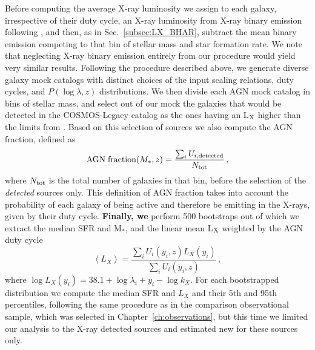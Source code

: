 Before computing the average X-ray luminosity we assign to each galaxy, irrespective of their duty cycle, an X-ray luminosity from X-ray binary emission following \citet[][Table 3]{2016ApJ...825....7L}, and then, as in Sec.~\ref{subsec:LX_BHAR}, subtract the mean binary emission competing to that bin of stellar mass and star formation rate. We note that neglecting X-ray binary emission entirely from our procedure would yield very similar results.
Following the procedure described above, we generate diverse galaxy mock catalogs with distinct choices of the input scaling relations, duty cycles, and $P(\log\lambda,z)$ distributions. 
We then divide each AGN mock catalog in bins of stellar mass, and select out of our mock the galaxies that would be detected in the COSMOS-Legacy catalog as the ones having an L$_{\rm X}$ higher than the limits from \citet{2016ApJ...817...34M}. Based on this selection of sources we also compute the AGN fraction, defined as
\begin{equation}
{\rm AGN\;fraction}(M_*,z)=\frac{\sum_i U_{i,{\rm detected}}} {N_{\rm tot}}\, ,
    \label{eq:AGN_fraction}
\end{equation}
where $N_{\rm tot}$ is the total number of galaxies in that bin, before the selection of the {\it detected} sources only. This definition of AGN fraction takes into account the probability of each galaxy of being active and therefore be emitting in the X-rays, given by their duty cycle.
{\bf Finally, we} perform 500 bootstraps out of which we extract the median SFR and M$_*$, and the linear mean L$_{\rm X}$ weighted by the AGN duty cycle %
\begin{equation}
\left<L_X\right>=\frac{\sum_i U_i(y_i,z) L_X(y_i)} {\sum_i U_i(y_i,z)}\, ,
    \label{eq:meanLx}
\end{equation}
where $\log L_X(y_i)=38.1 +\log \lambda_i +y_i-\log k_X$. For each bootstrapped distribution we compute the median SFR and $L_X$ and their 5th and 95th percentiles, following the same procedure as in the comparison observational sample, which was selected in Chapter~\ref{ch:observations}, but this time we limited our analysis to the X-ray detected sources and estimated new \LX{} for these sources only.

